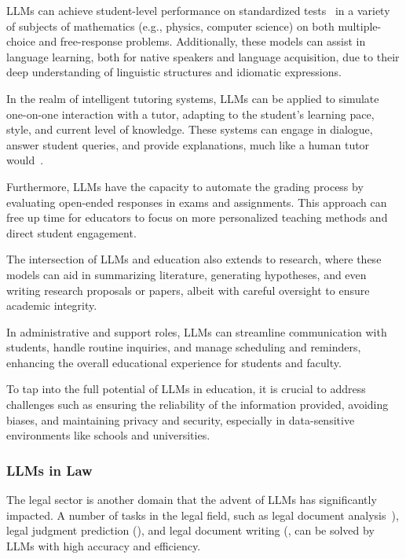 LLMs can achieve student-level performance on standardized tests~\cite{openai2024gpt4} in a variety of subjects of mathematics (e.g., physics, computer science) on both multiple-choice and free-response problems.
Additionally, these models can assist in language learning, both for native speakers and language acquisition, due to their deep understanding of linguistic structures and idiomatic expressions.

In the realm of intelligent tutoring systems, LLMs can be applied to simulate one-on-one interaction with a tutor, adapting to the student's learning pace, style, and current level of knowledge.
These systems can engage in dialogue, answer student queries, and provide explanations, much like a human tutor would~\cite{malinka2023educationalimpact,susnjak2022chatgpt}.

Furthermore, LLMs have the capacity to automate the grading process by evaluating open-ended responses in exams and assignments.
This approach can free up time for educators to focus on more personalized teaching methods and direct student engagement.

The intersection of LLMs and education also extends to research, where these models can aid in summarizing literature, generating hypotheses, and even writing research proposals or papers, albeit with careful oversight to ensure academic integrity.

In administrative and support roles, LLMs can streamline communication with students, handle routine inquiries, and manage scheduling and reminders, enhancing the overall educational experience for students and faculty.

To tap into the full potential of LLMs in education, it is crucial to address challenges such as ensuring the reliability of the information provided, avoiding biases, and maintaining privacy and security, especially in data-sensitive environments like schools and universities.

\subsubsection{LLMs in Law}
\label{subsubsec:llms-in-law}


The legal sector is another domain that the advent of LLMs has significantly impacted.
A number of tasks in the legal field, such as legal document analysis~\cite{blairstanek2023gpt3statutory}), legal judgment prediction (\textcite{trautmann2022legalprompt}), and legal document writing (\textcite{choi2023chatgptlaw}, can be solved by LLMs with high accuracy and efficiency.

